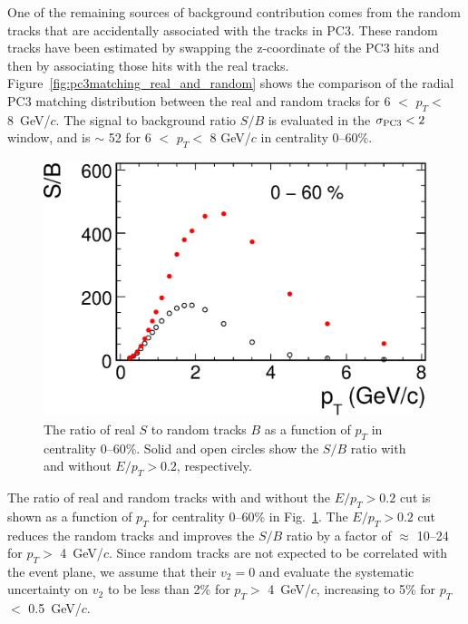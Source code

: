 \documentclass[aps,prc,superscriptaddress,showpacs,floatfix,twocolumn]{revtex4}
\newcommand \gevc{GeV/$c$\xspace}
\newcommand \pt{\mbox{$p_T$}\xspace}
\begin{document}
One of the remaining sources of background contribution comes 
from the random tracks that are accidentally associated with the 
tracks in PC3. These random tracks have been estimated by 
swapping the z-coordinate of the PC3 hits and then by 
associating those hits with the real tracks. 
Figure~\ref{fig:pc3matching_real_and_random} shows the 
comparison of the radial PC3 matching distribution between the 
real and random tracks for 6 $<$ \pt $<$ 8~\gevc.  The signal to 
background ratio $S/B$ is evaluated in the $\sigma_{\rm PC3} < 2$ 
window, and is $\sim$ 52 for 6 $<$ \pt $<$ 8 \gevc in 
centrality 0--60\%.

\begin{figure}[t]
\includegraphics[width=1.0\linewidth]{sb_vs_pt_real_and_random.eps}
\caption{\label{fig:sb_vs_pt_real_and_random}
The ratio of real $S$ to random tracks $B$ as a function of \pt 
in centrality 0--60\%. Solid and open circles show the $S/B$ 
ratio with and without $E/\pt > 0.2$, respectively.
}
\end{figure}


The ratio of real and random tracks with and without the 
$E/\pt > 0.2$ cut is shown as a function of \pt for centrality 
0--60\% in Fig.~\ref{fig:sb_vs_pt_real_and_random}. 
The $E/\pt > 0.2$ cut reduces the random tracks and improves the 
$S/B$ ratio by a factor of $\approx$ 10--24 for \pt $>$ 4~\gevc. 
Since random tracks are not expected to be correlated with the 
event plane, we assume that their $v_2 = 0$ and evaluate the 
systematic uncertainty on $v_2$ to be less than 2\% for \pt $>$ 
4~\gevc, increasing to 5\% for \pt $<$ 0.5~\gevc.
\end{document}
